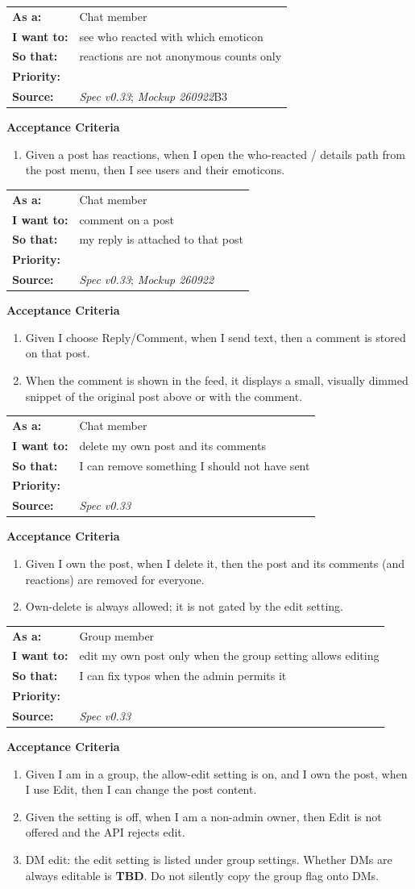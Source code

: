 \documentclass[11pt,a4paper]{article}
\makeatletter
\newcommand{\priPzero}{\colorbox{p0}{\makebox[4.6em]{\textcolor{white}{\scriptsize\bfseries P0 V1}}}}
\newcommand{\srcSpec}{\textit{Spec v0.33}}
\newcommand{\srcMock}{\textit{Mockup 260922}}
\newenvironment{story}[1]{%
  \Needspace{10\baselineskip}%
  \vspace{0.7em}%
  \noindent
  \colorbox{navy}{\makebox[\dimexpr\textwidth-2\fboxsep\relax][l]{\textcolor{white}{\bfseries\ #1}}}%
  \par\vspace{0.35em}%
}{\par\vspace{0.55em}}
\newcommand{\storymeta}[5]{%
  \noindent
  \begin{tabularx}{\textwidth}{@{}>{\bfseries}l X@{}}
    As a: & #1 \\
    I want to: & #2 \\
    So that: & #3 \\
    Priority: & #4 \\
    Source: & #5 \\
  \end{tabularx}
  \par\vspace{0.3em}
}
\newcommand{\achead}{\noindent\textbf{Acceptance Criteria}\par}
\makeatother
\begin{document}
\begin{story}{POST-005 --- See who reacted}
\storymeta{Chat member}{see who reacted with which emoticon}{reactions are not anonymous counts only}{\priPzero}{\srcSpec; \srcMock B3}
\achead
\begin{enumerate}
  \item Given a post has reactions, when I open the who-reacted / details path from the post menu, then I see users and their emoticons.
\end{enumerate}
\end{story}

\begin{story}{POST-006 --- Comment with original-post snippet}
\storymeta{Chat member}{comment on a post}{my reply is attached to that post}{\priPzero}{\srcSpec; \srcMock}
\achead
\begin{enumerate}
  \item Given I choose Reply/Comment, when I send text, then a comment is stored on that post.
  \item When the comment is shown in the feed, it displays a small, visually dimmed snippet of the original post above or with the comment.
\end{enumerate}
\end{story}

\begin{story}{POST-007 --- Delete own post}
\storymeta{Chat member}{delete my own post and its comments}{I can remove something I should not have sent}{\priPzero}{\srcSpec}
\achead
\begin{enumerate}
  \item Given I own the post, when I delete it, then the post and its comments (and reactions) are removed for everyone.
  \item Own-delete is always allowed; it is not gated by the edit setting.
\end{enumerate}
\end{story}

\begin{story}{POST-008 --- Edit own post if the group allows it}
\storymeta{Group member}{edit my own post only when the group setting allows editing}{I can fix typos when the admin permits it}{\priPzero}{\srcSpec}
\achead
\begin{enumerate}
  \item Given I am in a group, the allow-edit setting is on, and I own the post, when I use Edit, then I can change the post content.
  \item Given the setting is off, when I am a non-admin owner, then Edit is not offered and the API rejects edit.
  \item DM edit: the edit setting is listed under group settings. Whether DMs are always editable is \textbf{TBD}. Do not silently copy the group flag onto DMs.
\end{enumerate}
\end{story}
\end{document}
